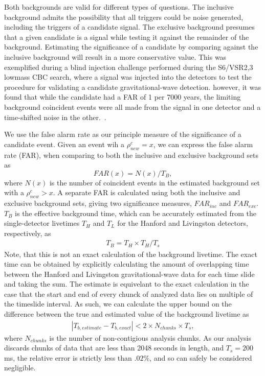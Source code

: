 Both backgrounds are valid for different types of questions. The inclusive background admits the possibility that all triggers could be noise generated, including the triggers of a candidate signal. The exclusive background presumes that a given candidate is a signal while testing it against the remainder of the background. Estimating the significance of a candidate by comparing against the inclusive background will result in a more conservative value. This was exemplified during a blind injection challenge performed during the S6/VSR2,3 lowmass CBC search, where a signal was injected into the detectors to test the procedure for validating a candidate gravitational-wave detection. however, it was found that while the candidate had a FAR of 1 per 7000 years, the limiting background coincident events were all made from the signal in one detector and a time-shifted noise in the other.~\cite{Collaboration:2011np}.

We use the false alarm rate as our principle measure of the significance of a candidate event. Given an event wih a $\rho^c_{new}=x$, we can express the false alarm rate (FAR), when comparing to both the inclusive and exclusive background sets as
%
\begin{equation}
FAR (x) = N (x) / {T_B},
\end{equation}
%
where $N(x)$ is the number of coincident events in the estimated background set with a $\rho^c_{new} > x$. A separate FAR is calculated using both the inclusive and exclusive background sets, giving two significance measures, $FAR_{inc}$ and $FAR_{exc}$. $T_B$ is the effective background time, which can be accurately estimated from the single-detector livetimes $T_H$ and $T_L$ for the Hanford and Livingston detectors, respectively, as
%
\begin{eqnarray}
T_B =  T_H \times T_H / T_s
\end{eqnarray}
%
Note, that this is not an exact calculation of the background livetime. The exact time can be obtained by explicitly calculating the amount of overlapping time between the Hanford and Livingston gravitational-wave data for each time slide and taking the sum. The estimate is equivelant to the exact calculation in the case that the start and end of every chunck of analyzed data lies on multiple of the timeslide interval. As such, we can calculate the upper bound on the difference between the true and estimated value of the background livetime as
%
\begin{eqnarray}
|T_{b, estimate} - T_{b, exact} |< 2 \times N_{chunks} \times T_s,
\end{eqnarray}
%
where $N_{chunks}$ is the number of non-contigious analysis chunks. As our analysis discards chunks of data that are less than 2048 seconds in length, and  $T_s=200$ ms, the relative error is strictly less than $.02\%$, and so can safely be considered negligible.

